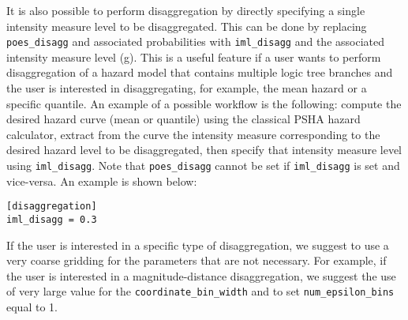 It is also possible to perform disaggregation by directly specifying a single
intensity measure level to be disaggregated. This can be done by replacing
\texttt{poes\_disagg} and associated probabilities with \texttt{iml\_disagg}
and the associated intensity measure level (g). This is a useful feature if
a user wants to perform disaggregation of a hazard model that contains multiple
logic tree branches and the user is interested in disaggregating, for example,
the mean hazard or a specific quantile. An example of a possible workflow is
the following: compute the desired hazard curve (mean or quantile) using the
classical PSHA hazard calculator, extract from the curve the intensity measure
corresponding to the desired hazard level to be disaggregated, then specify
that intensity measure level using \texttt{iml\_disagg}. Note that
\texttt{poes\_disagg} cannot be set if \texttt{iml\_disagg} is set and vice-versa. 
An example is shown below:

\begin{verbatim}
[disaggregation]
iml_disagg = 0.3
\end{verbatim}

If the user is interested in a specific type of disaggregation, we suggest to
use a very coarse gridding for the parameters that are  not necessary. For
example, if the user is interested in a magnitude-distance  disaggregation, we
suggest the use of very large value for the
\texttt{coordinate\_\-bin\_\-width} and to set  \texttt{num\_epsilon\_bins}
equal to 1.
